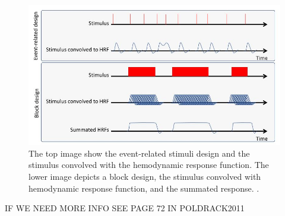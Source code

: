 \begin{figure}[H]                 
	\includegraphics[width=.8\textwidth]{figures/aBackground/event_vs_block}  
	\caption{The top image show the event-related stimuli design and the stimulus convolved with the hemodynamic response function. The lower image depicts a block design, the stimulus convolved with hemodynamic response function, and the summated response.  \cite{Moayedi2018}.}
	\label{fig:back:e_vs_b} 
\end{figure}

IF WE NEED MORE INFO SEE PAGE 72 IN POLDRACK2011

 

